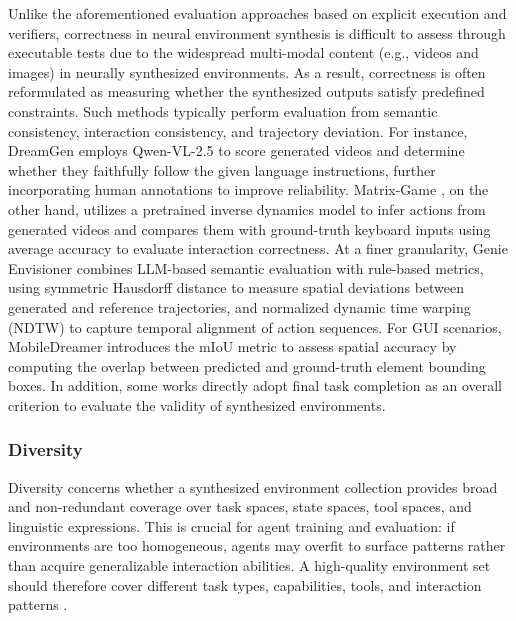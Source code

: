 \documentclass{llmxive}
\begin{document}

Unlike the aforementioned evaluation approaches based on explicit execution and verifiers, correctness in neural environment synthesis is difficult to assess through executable tests due to the widespread multi-modal content (e.g., videos and images) in neurally synthesized environments. As a result, correctness is often reformulated as measuring whether the synthesized outputs satisfy predefined constraints. Such methods typically perform evaluation from semantic consistency, interaction consistency, and trajectory deviation. For instance, DreamGen \cite{DreamGen} employs Qwen-VL-2.5 to score generated videos and determine whether they faithfully follow the given language instructions, further incorporating human annotations to improve reliability. Matrix-Game \cite{Matrix-Game}, on the other hand, utilizes a pretrained inverse dynamics model to infer actions from generated videos and compares them with ground-truth keyboard inputs using average accuracy to evaluate interaction correctness. At a finer granularity, Genie Envisioner \cite{Genie_Envisioner} combines LLM-based semantic evaluation with rule-based metrics, using symmetric Hausdorff distance to measure spatial deviations between generated and reference trajectories, and normalized dynamic time warping (NDTW) to capture temporal alignment of action sequences. For GUI scenarios, MobileDreamer \cite{MobileDreamer} introduces the mIoU metric to assess spatial accuracy by computing the overlap between predicted and ground-truth element bounding boxes. In addition, some works \cite{WKM, Dyna-Think} directly adopt final task completion as an overall criterion to evaluate the validity of synthesized environments.

\subsubsection{Diversity}

Diversity concerns whether a synthesized environment collection provides broad and non-redundant coverage over task spaces, state spaces, tool spaces, and linguistic expressions. This is crucial for agent training and evaluation: if environments are too homogeneous, agents may overfit to surface patterns rather than acquire generalizable interaction abilities. A high-quality environment set should therefore cover different task types, capabilities, tools, and interaction patterns \cite{SWE-World}.
\end{document}

